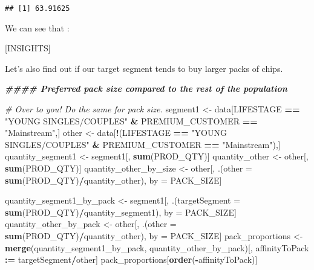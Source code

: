 \documentclass[
]{article}
\newenvironment{Shaded}{\begin{snugshade}}{\end{snugshade}}
\newcommand{\AttributeTok}[1]{\textcolor[rgb]{0.13,0.29,0.53}{#1}}
\newcommand{\CommentTok}[1]{\textcolor[rgb]{0.56,0.35,0.01}{\textit{#1}}}
\newcommand{\DocumentationTok}[1]{\textcolor[rgb]{0.56,0.35,0.01}{\textbf{\textit{#1}}}}
\newcommand{\FunctionTok}[1]{\textcolor[rgb]{0.13,0.29,0.53}{\textbf{#1}}}
\newcommand{\NormalTok}[1]{#1}
\newcommand{\OtherTok}[1]{\textcolor[rgb]{0.56,0.35,0.01}{#1}}
\newcommand{\SpecialCharTok}[1]{\textcolor[rgb]{0.81,0.36,0.00}{\textbf{#1}}}
\newcommand{\StringTok}[1]{\textcolor[rgb]{0.31,0.60,0.02}{#1}}
\begin{document}
\begin{verbatim}
## [1] 63.91625
\end{verbatim}

We can see that :

{[}INSIGHTS{]}

Let's also find out if our target segment tends to buy larger packs of
chips.

\begin{Shaded}
\begin{Highlighting}[]
\DocumentationTok{\#\#\#\# Preferred pack size compared to the rest of the population}

\CommentTok{\# Over to you! Do the same for pack size.}
\NormalTok{segment1 }\OtherTok{\textless{}{-}}\NormalTok{ data[LIFESTAGE }\SpecialCharTok{==} \StringTok{"YOUNG SINGLES/COUPLES"} \SpecialCharTok{\&}\NormalTok{ PREMIUM\_CUSTOMER }\SpecialCharTok{==} \StringTok{"Mainstream"}\NormalTok{,]}
\NormalTok{other }\OtherTok{\textless{}{-}}\NormalTok{ data[}\SpecialCharTok{!}\NormalTok{(LIFESTAGE }\SpecialCharTok{==} \StringTok{"YOUNG SINGLES/COUPLES"} \SpecialCharTok{\&}\NormalTok{ PREMIUM\_CUSTOMER }\SpecialCharTok{==} \StringTok{"Mainstream"}\NormalTok{),]}
\NormalTok{quantity\_segment1 }\OtherTok{\textless{}{-}}\NormalTok{ segment1[, }\FunctionTok{sum}\NormalTok{(PROD\_QTY)]}
\NormalTok{quantity\_other }\OtherTok{\textless{}{-}}\NormalTok{ other[, }\FunctionTok{sum}\NormalTok{(PROD\_QTY)]}
\NormalTok{quantity\_other\_by\_size }\OtherTok{\textless{}{-}}\NormalTok{ other[, .(}\AttributeTok{other =} \FunctionTok{sum}\NormalTok{(PROD\_QTY)}\SpecialCharTok{/}\NormalTok{quantity\_other), by }\OtherTok{=}\NormalTok{ PACK\_SIZE]}

\NormalTok{quantity\_segment1\_by\_pack }\OtherTok{\textless{}{-}}\NormalTok{ segment1[, .(}\AttributeTok{targetSegment =} \FunctionTok{sum}\NormalTok{(PROD\_QTY)}\SpecialCharTok{/}\NormalTok{quantity\_segment1), by }\OtherTok{=}\NormalTok{ PACK\_SIZE]}
\NormalTok{quantity\_other\_by\_pack }\OtherTok{\textless{}{-}}\NormalTok{ other[, .(}\AttributeTok{other =} \FunctionTok{sum}\NormalTok{(PROD\_QTY)}\SpecialCharTok{/}\NormalTok{quantity\_other), by }\OtherTok{=}\NormalTok{ PACK\_SIZE]}
\NormalTok{pack\_proportions }\OtherTok{\textless{}{-}} \FunctionTok{merge}\NormalTok{(quantity\_segment1\_by\_pack, quantity\_other\_by\_pack)[, affinityToPack }\SpecialCharTok{:=}\NormalTok{ targetSegment}\SpecialCharTok{/}\NormalTok{other]}
\NormalTok{pack\_proportions[}\FunctionTok{order}\NormalTok{(}\SpecialCharTok{{-}}\NormalTok{affinityToPack)]}
\end{Highlighting}
\end{Shaded}
\end{document}
